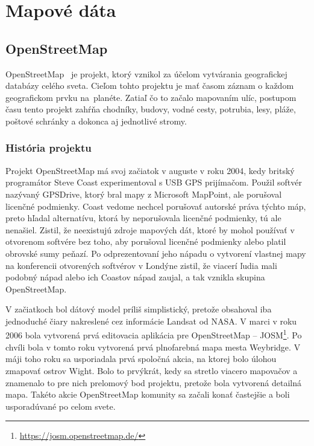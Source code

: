 




\chapter{Mapové dáta} 
\label{map-data}

\section{OpenStreetMap}
OpenStreetMap~\cite{openstreet} je projekt, ktorý vznikol za účelom vytvárania geografickej databázy celého sveta. Cieľom tohto projektu je mať časom záznam o každom geografickom prvku na~planéte. Zatiaľ čo to začalo mapovaním ulíc, postupom času tento projekt zahŕňa chodníky, budovy, vodné cesty, potrubia, lesy, pláže, poštové schránky a dokonca aj jednotlivé stromy.

\subsection{História projektu}
Projekt OpenStreetMap má svoj začiatok v auguste v roku 2004, kedy britský programátor Steve Coast experimentoval s USB GPS prijímačom. Použil softvér nazývaný GPSDrive, ktorý bral mapy z Microsoft MapPoint, ale porušoval licenčné podmienky. Coast vedome nechcel porušovať autorské práva týchto máp, preto hľadal alternatívu, ktorá by neporušovala licenčné podmienky, tú ale nenašiel. Zistil, že neexistujú zdroje mapových dát, ktoré by mohol používať v otvorenom softvére bez toho, aby porušoval licenčné podmienky alebo platil obrovské sumy peňazí. Po odprezentovaní jeho nápadu o vytvorení vlastnej mapy na konferencii otvorených softvérov v Londýne zistil, že viacerí ľudia mali podobný nápad alebo ich Coastov nápad zaujal, a tak vznikla skupina OpenStreetMap.

V začiatkoch bol dátový model príliš simplistický, pretože obsahoval iba jednoduché čiary nakreslené cez informácie Landsat od NASA. V marci v roku 2006 bola vytvorená prvá editovacia aplikácia pre OpenStreetMap \--- JOSM\footnote{\url{https://josm.openstreetmap.de/}}. Po chvíli bola v tomto roku vytvorená prvá plnofarebná mapa mesta Weybridge. V máji toho roku sa usporiadala prvá spoločná akcia, na ktorej bolo úlohou zmapovať ostrov Wight. Bolo to prvýkrát, kedy sa stretlo viacero mapovačov a znamenalo to pre nich prelomový bod projektu, pretože bola vytvorená detailná mapa. Takéto akcie OpenStreetMap komunity sa začali konať častejšie a boli usporadúvané po celom svete.

